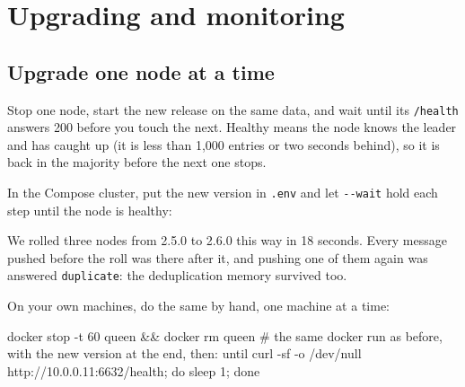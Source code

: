 %

\section{Upgrading and monitoring}

\subsection{Upgrade one node at a time}

Stop one node, start the new release on the same data, and wait until its \texttt{/health}
answers 200 before you touch the next. Healthy means the node knows the leader and has caught up
(it is less than 1,000 entries or two seconds behind), so it is back in the majority before the
next one stops.

In the Compose cluster, put the new version in \texttt{.env} and let \texttt{-{}-wait} hold each
step until the node is healthy:


We rolled three nodes from 2.5.0 to 2.6.0 this way in 18 seconds. Every message pushed before the
roll was there after it, and pushing one of them again was answered \texttt{duplicate}: the
deduplication memory survived too.

On your own machines, do the same by hand, one machine at a time:

\begin{shell}
docker stop -t 60 queen && docker rm queen
# the same docker run as before, with the new version at the end, then:
until curl -sf -o /dev/null http://10.0.0.11:6632/health; do sleep 1; done
\end{shell}

